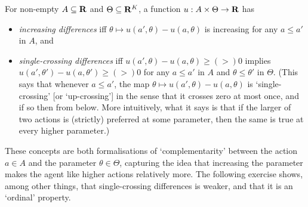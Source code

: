 \begin{definition}
	\label{definition:id}
	For non-empty $A \subseteq \mathbf{R}$ and $\Theta \subseteq \mathbf{R}^K$, a function $u : A \times \Theta \to \mathbf{R}$ has
	\begin{itemize}
	
		\item \emph{increasing differences} iff $\theta \mapsto u(a',\theta) - u(a,\theta)$ is increasing for any $a \leq a'$ in $A$, and

		\item \emph{single-crossing differences} iff $u(a',\theta) - u(a,\theta) \geq \mathrel{(>)} 0$ implies $u(a',\theta') - u(a,\theta') \geq \mathrel{(>)} 0$ for any $a \leq a'$ in $A$ and $\theta \leq \theta'$ in $\Theta$.
		(This says that whenever $a \leq a'$, the map $\theta \mapsto u(a',\theta) - u(a,\theta)$ is `single-crossing' [or `up-crossing'] in the sense that it crosses zero at most once, and if so then from below. More intuitively, what it says is that if the larger of two actions is (strictly) preferred at some parameter, then the same is true at every higher parameter.)

	
	\end{itemize}
\end{definition}

These concepts are both formalisations of `complementarity' between the action $a \in A$ and the parameter $\theta \in \Theta$, capturing the idea that increasing the parameter makes the agent like higher actions relatively more. The following exercise shows, among other things, that single-crossing differences is weaker, and that it is an `ordinal' property.

